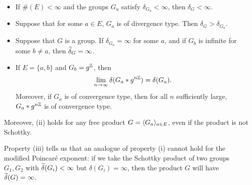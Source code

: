 \begin{proposition}
\label{propositionSproductexponent}
~
\begin{itemize}
\item[(i)] If $\#(E) < \infty$ and the groups $G_a$ satisfy $\delta_{G_a} < \infty$, then $\delta_G < \infty$.
\item[(ii)] Suppose that for some $a\in E$, $G_a$ is of divergence type. Then $\delta_G > \delta_{G_a}$.
\item[(iii)] Suppose that $G$ is a group. If $\delta_{G_a} = \infty$ for some $a$, and if $G_b$ is infinite for some $b\neq a$, then $\widetilde\delta_G = \infty$.
\item[(iv)] If $E = \{a,b\}$ and $G_b = g^\Z$, then
\[
\lim_{n\to\infty} \delta(G_a\ast g^{n\Z}) = \delta(G_a).
\]
Moreover, if $G_a$ is of convergence type, then for all $n$ sufficiently large, $G_a\ast g^{n\Z}$ is of convergence type.
\end{itemize}
Moreover, (ii) holds for any free product $G = \langle G_a\rangle_{a\in E}$, even if the product is not Schottky.
\end{proposition}


\begin{remark}
Property (iii) tells us that an analogue of property (i) cannot hold for the modified Poincar\'e exponent: if we take the Schottky product of two groups $G_1,G_2$ with $\widetilde\delta(G_i) < \infty$ but $\delta(G_i) = \infty$, then the product $G$ will have $\widetilde\delta(G) = \infty$.
\end{remark}

